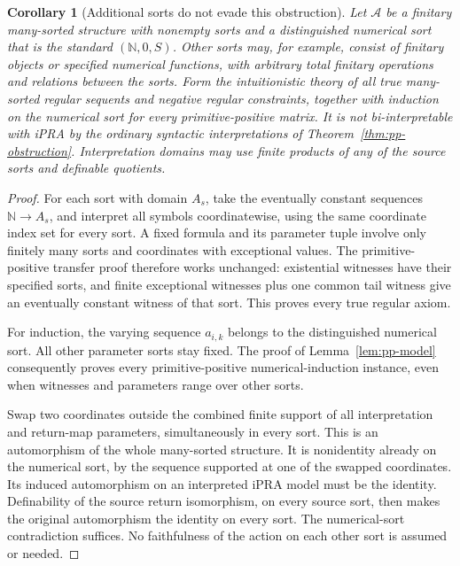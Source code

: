 \documentclass[11pt,letterpaper]{article}
\newtheorem{corollary}[theorem]{Corollary}
\theoremstyle{definition}\newtheorem{definition}[theorem]{Definition}
\theoremstyle{remark}\newtheorem{remark}[theorem]{Remark}
\begin{document}
\begin{corollary}[Additional sorts do not evade this obstruction]
\label{cor:pp-many-sorted}
Let $\mathcal A$ be a finitary many-sorted structure with nonempty
sorts and a distinguished numerical sort that is the standard
$(\mathbb N,0,S)$.  Other sorts may, for example, consist of finitary
objects or specified numerical functions, with arbitrary total finitary
operations and relations between the sorts.  Form the intuitionistic
theory of all true many-sorted regular sequents and negative regular
constraints, together with induction on the numerical sort for every
primitive-positive matrix.  It is not bi-interpretable with iPRA by
the ordinary syntactic interpretations of
Theorem~\ref{thm:pp-obstruction}.  Interpretation domains may use finite
products of any of the source sorts and definable quotients.
\end{corollary}
\begin{proof}
For each sort with domain $A_s$, take the eventually constant sequences
$\mathbb N\to A_s$, and interpret all symbols coordinatewise, using
the same coordinate index set for every sort.  A fixed formula and its
parameter tuple involve only finitely many sorts and coordinates with
exceptional values.  The primitive-positive transfer proof therefore
works unchanged: existential witnesses have their specified sorts,
and finite exceptional witnesses plus one common tail witness give
an eventually constant witness of that sort.  This proves every true
regular axiom.

For induction, the varying sequence $a_{i,k}$ belongs to the
distinguished numerical sort.  All other parameter sorts stay fixed.
The proof of Lemma~\ref{lem:pp-model} consequently proves every
primitive-positive numerical-induction instance, even when witnesses
and parameters range over other sorts.

Swap two coordinates outside the combined finite support of all
interpretation and return-map parameters, simultaneously in every
sort.  This is an automorphism of the whole many-sorted structure.
It is nonidentity already on the numerical sort, by the sequence
supported at one of the swapped coordinates.  Its induced
automorphism on an interpreted iPRA model must be the identity.
Definability of the source return isomorphism, on every source sort,
then makes the original automorphism the identity on every sort.
The numerical-sort contradiction suffices.  No faithfulness of the
action on each other sort is assumed or needed.
\end{proof}
\end{document}
